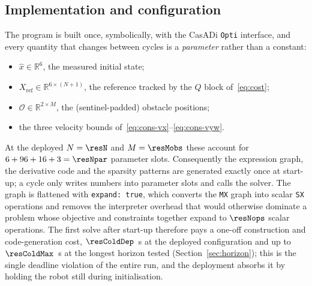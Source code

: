 \documentclass[11pt,a4paper]{article}
\newcommand{\R}{\mathbb{R}}
\begin{document}
\subsection{Implementation and configuration}
\label{sec:impl}

The program is built once, symbolically, with the CasADi \texttt{Opti} interface, and every quantity that
changes between cycles is a \emph{parameter} rather than a constant:
\begin{itemize}\itemsep2pt
  \item $\hat x\in\R^{6}$, the measured initial state;
  \item $X_{\mathrm{ref}}\in\R^{6\times(N+1)}$, the reference tracked by the $Q$ block of~\eqref{eq:cost};
  \item $\mathcal{O}\in\R^{2\times M}$, the (sentinel-padded) obstacle positions;
  \item the three velocity bounds of~\eqref{eq:cons-vx}--\eqref{eq:cons-vyw}.
\end{itemize}
At the deployed $N=\resN$ and $M=\resMobs$ these account for $6+96+16+3=\resNpar$ parameter slots.
Consequently the expression graph, the derivative code and the sparsity patterns are generated exactly once at
start-up; a cycle only writes numbers into parameter slots and calls the solver. The graph is flattened with
\texttt{expand:\,true}, which converts the \texttt{MX} graph into scalar \texttt{SX} operations and removes
the interpreter overhead that would otherwise dominate a problem whose objective and constraints together
expand to $\resNops$ scalar operations. The first solve after start-up therefore pays a one-off construction
and code-generation cost, $\resColdDep$~s at the deployed configuration and up to $\resColdMax$~s at the
longest horizon tested (Section~\ref{sec:horizon}); this is the single deadline violation of the entire run,
and the deployment absorbs it by holding the robot still during initialisation.
\end{document}
